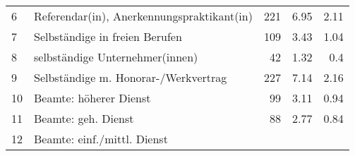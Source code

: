 \begin{longtable}{lXrrr}
     6 &
     \multicolumn{1}{X}{ Referendar(in), Anerkennungspraktikant(in)   } &


       \num{221} &
       \num[round-mode=places,round-precision=2]{6.95} &
         \num[round-mode=places,round-precision=2]{2.11} \\

     7 &
     \multicolumn{1}{X}{ Selbständige in freien Berufen   } &


       \num{109} &
       \num[round-mode=places,round-precision=2]{3.43} &
         \num[round-mode=places,round-precision=2]{1.04} \\

     8 &
     \multicolumn{1}{X}{ selbständige Unternehmer(innen)   } &


       \num{42} &
       \num[round-mode=places,round-precision=2]{1.32} &
         \num[round-mode=places,round-precision=2]{0.4} \\

     9 &
     \multicolumn{1}{X}{ Selbständige m. Honorar-/Werkvertrag   } &


       \num{227} &
       \num[round-mode=places,round-precision=2]{7.14} &
         \num[round-mode=places,round-precision=2]{2.16} \\

     10 &
     \multicolumn{1}{X}{ Beamte: höherer Dienst   } &


       \num{99} &
       \num[round-mode=places,round-precision=2]{3.11} &
         \num[round-mode=places,round-precision=2]{0.94} \\

     11 &
     \multicolumn{1}{X}{ Beamte: geh. Dienst   } &


       \num{88} &
       \num[round-mode=places,round-precision=2]{2.77} &
         \num[round-mode=places,round-precision=2]{0.84} \\

     12 &
     \multicolumn{1}{X}{ Beamte: einf./mittl. Dienst   } &



\end{longtable}
